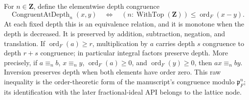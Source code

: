 \begin{definition}
For $n\in\mathbf Z$, define the elementwise depth congruence
\[
  \operatorname{CongruentAtDepth}_n(x,y)
  \quad\Longleftrightarrow\quad
  (n:\operatorname{WithTop}(\mathbf Z))\leq\operatorname{ord}_F(x-y).
\]
At each fixed depth this is an equivalence relation, and it is monotone when
the depth is decreased.  It is preserved by addition, subtraction, negation,
and translation.  If $\operatorname{ord}_F(a)\geq r$, multiplication by $a$ carries depth
$s$ congruence to depth $r+s$ congruence; in particular integral factors
preserve depth.  More precisely, if $a\equiv_n b$, $x\equiv_n y$,
$\operatorname{ord}_F(a)\geq0$, and $\operatorname{ord}_F(y)\geq0$, then
$ax\equiv_n by$.  Inversion preserves depth when both elements have order
zero.  This raw inequality is the order-theoretic form of
the manuscript's congruence modulo $\mathfrak p_F^n$; its identification with
the later fractional-ideal API belongs to the lattice node.
\leanok
{}
\FormalizationContract
\end{definition}
